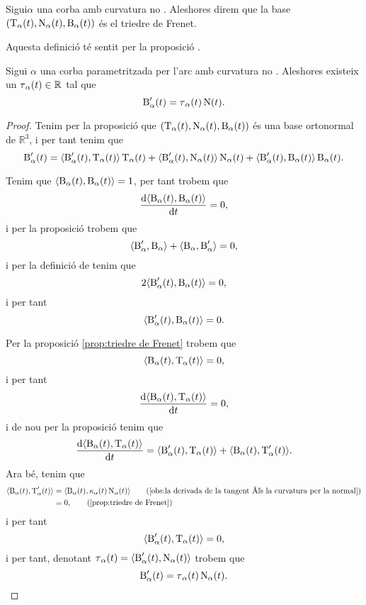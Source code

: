 \documentclass[../Apunts.tex]{subfiles}
\begin{document}
	\begin{definition}
		\label{def:triedre de Frenet}
		Sigui\(\alpha\) una corba amb curvatura no \nulla{}. Aleshores direm que la base \((\operatorname{T}_{\alpha}(t),\operatorname{N}_{\alpha}(t),\operatorname{B}_{\alpha}(t))\) és el triedre de Frenet.
		
		Aquesta definició té sentit per la proposició .
	\end{definition}
	\begin{proposition}
		\label{prop:torsió}
		Sigui \(\alpha\) una corba parametritzada per l'arc amb curvatura no \nulla{}. Aleshores existeix un \(\operatorname{\tau}_{\alpha}(t)\in\mathbb{R}\) tal que
		\[\operatorname{B}'_{\alpha}(t)=\operatorname{\tau}_{\alpha}(t)\operatorname{N}(t).\]
		\begin{proof}
			Tenim per la proposició  que \((\operatorname{T}_{\alpha}(t),\operatorname{N}_{\alpha}(t),\operatorname{B}_{\alpha}(t))\) és una base ortonormal de \(\mathbb{R}^{3}\), i per tant tenim que %
			\[\binormal'_{\alpha}(t)=\prodesc{\binormal'_{\alpha}(t)}{\tangent_{\alpha}(t)}\tangent_{\alpha}(t)+\prodesc{\binormal'_{\alpha}(t)}{\normal_{\alpha}(t)}\normal_{\alpha}(t)+\prodesc{\binormal'_{\alpha}(t)}{\binormal_{\alpha}(t)}\binormal_{\alpha}(t).\]
			
			Tenim que \(\prodesc{\binormal_{\alpha}(t)}{\binormal_{\alpha}(t)}=1\), per tant trobem que
			\[\frac{\diff\prodesc{\binormal_{\alpha}(t)}{\binormal_{\alpha}(t)}}{\diff t}=0,\]
			i per la proposició  trobem que
			\[\prodesc{\binormal'_{\alpha}}{\binormal_{\alpha}}+\prodesc{\binormal_{\alpha}}{\binormal'_{\alpha}}=0,\]
			i per la definició de  tenim que
			\[2\prodesc{\binormal'_{\alpha}(t)}{\binormal_{\alpha}(t)}=0,\]
			i per tant
			\[\prodesc{\binormal'_{\alpha}(t)}{\binormal_{\alpha}(t)}=0.\]
			
			Per la proposició \ref{prop:triedre de Frenet} trobem que
			\[\prodesc{\binormal_{\alpha}(t)}{\tangent_{\alpha}(t)}=0,\]
			i per tant
			\[\frac{\diff\prodesc{\binormal_{\alpha}(t)}{\tangent_{\alpha}(t)}}{\diff t}=0,\]
			i de nou per la proposició  tenim que
			\[\frac{\diff\prodesc{\binormal_{\alpha}(t)}{\tangent_{\alpha}(t)}}{\diff t}=\prodesc{\binormal'_{\alpha}(t)}{\tangent_{\alpha}(t)}+\prodesc{\binormal_{\alpha}(t)}{\tangent'_{\alpha}(t)}.\]
			Ara bé, tenim que
			\begin{align*}
				\prodesc{\binormal_{\alpha}(t)}{\tangent'_{\alpha}(t)}&=\prodesc{\binormal_{\alpha}(t)}{\curvatura_{\alpha}(t)\normal_{\alpha}(t)} \tag{\ref{obs:la derivada de la tangent és la curvatura per la normal}} \\
				&=0, \tag{\ref{prop:triedre de Frenet}}
			\end{align*}
			i per tant
			\[\prodesc{\binormal'_{\alpha}(t)}{\tangent_{\alpha}(t)}=0,\]
			i per tant, denotant \(\torsio_{\alpha}(t)=\prodesc{\binormal'_{\alpha}(t)}{\normal_{\alpha}(t)}\) trobem que
			\[\operatorname{B}'_{\alpha}(t)=\operatorname{\tau}_{\alpha}(t)\operatorname{N}_{\alpha}(t).\qedhere\]
		\end{proof}
	\end{proposition}
\end{document}
